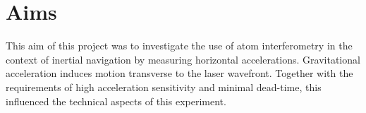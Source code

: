 \nocite{Dimopoulos2008}
\section{Aims}
This aim of this project was to investigate the use of atom
interferometry in the context of inertial navigation by measuring
horizontal accelerations. Gravitational acceleration induces motion
transverse to the laser wavefront. Together with the requirements of
high acceleration sensitivity and minimal dead-time, this influenced the technical
aspects of this experiment.  
